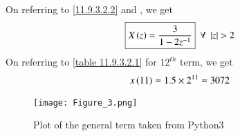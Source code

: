 \documentclass[journal,12pt,twocolumn]{IEEEtran}
\theoremstyle{remark}
\begin{document}
On referring to \eqref{11.9.3.2.2} and , we get
\begin{align}
   \boxed{X\brak{z}=\dfrac{3}{1-2z^{-1}}}\,\,\, \forall \,\,\, |z|>2
\end{align}
On referring to \ref{table 11.9.3.2.1} for $12^{th}$ term, we get
\begin{align}
x\left(11\right) = 1.5\times2^{11} = 3072
\end{align}
\begin{figure}[h]
\renewcommand\thefigure{1} 
    \centering
    \texttt{[image: Figure\_3.png]}
    \caption{Plot of the general term taken from Python3}
    \label{fig:1}
\end{figure}\\
\end{document}
